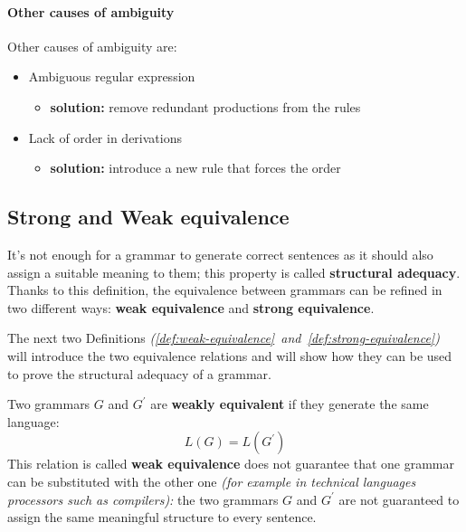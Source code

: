 \documentclass[english]{article}
\begin{document}
\paragraph{Other causes of ambiguity}
\label{par:other-causes-of-ambiguity}

Other causes of ambiguity are:

\begin{itemize}
  \item Ambiguous regular expression
        \begin{itemize}[label=\(\rightarrow\)]
          \item \textbf{solution:} remove redundant productions from the rules
        \end{itemize}
  \item Lack of order in derivations
        \begin{itemize}[label=\(\rightarrow\)]
          \item \textbf{solution:} introduce a new rule that forces the order
        \end{itemize}
\end{itemize}

\subsection{Strong and Weak equivalence}

It's not enough for a grammar to generate correct sentences as it should also assign a suitable meaning to them;
this property is called \textbf{structural adequacy}.
Thanks to this definition, the equivalence between grammars can be refined in two different ways:
\textbf{weak equivalence} and \textbf{strong equivalence}.

The next two Definitions \textit{(\ref{def:weak-equivalence}~and~\ref{def:strong-equivalence})} will introduce the two equivalence relations and will show how they can be used to prove the structural adequacy of a grammar.

\begin{definition}
  \label{def:weak-equivalence}
  Two grammars \(G\) and \(G^\prime\) are \textbf{weakly equivalent} if they generate the same language:
  \[ L(G) = L(G^\prime) \]
  This relation is called \textbf{weak equivalence} does not guarantee that one grammar can be substituted with the other one \textit{(for example in technical languages processors such as compilers):}
  the two grammars \(G\) and \(G^\prime\) are not guaranteed to assign the same meaningful structure to every sentence.
\end{definition}
\end{document}
